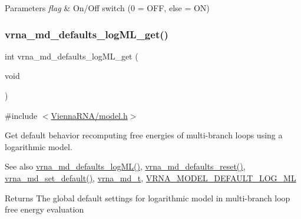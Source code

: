 \begin{DoxyParams}{Parameters}
{\em flag} & On/\+Off switch (0 = O\+FF, else = ON) \\
\hline
\end{DoxyParams}
\mbox{\label{group__model__details_ga93f04e070d529c5d0bb87c9681f6ad29}} 
\subsubsection{\texorpdfstring{vrna\+\_\+md\+\_\+defaults\+\_\+log\+M\+L\+\_\+get()}{vrna\_md\_defaults\_logML\_get()}}
{\footnotesize\ttfamily int vrna\+\_\+md\+\_\+defaults\+\_\+log\+M\+L\+\_\+get (\begin{DoxyParamCaption}\item[{void}]{ }\end{DoxyParamCaption})}



{\ttfamily \#include $<$\hyperlink{model_8h}{Vienna\+R\+N\+A/model.\+h}$>$}



Get default behavior recomputing free energies of multi-\/branch loops using a logarithmic model. 

\begin{DoxySeeAlso}{See also}
\hyperlink{group__model__details_ga3de50a73455d88c3957386933b8e1f90}{vrna\+\_\+md\+\_\+defaults\+\_\+log\+M\+L()}, \hyperlink{group__model__details_ga70834424cf804d149937de89f80ceb45}{vrna\+\_\+md\+\_\+defaults\+\_\+reset()}, \hyperlink{group__model__details_ga8ac6ff84936282436f822644bf841f66}{vrna\+\_\+md\+\_\+set\+\_\+default()}, \hyperlink{group__model__details_ga1f8a10e12a0a1915f2a4eff0b28ea17c}{vrna\+\_\+md\+\_\+t}, \hyperlink{group__model__details_ga938f68463e84fe060aa6502f428a517d}{V\+R\+N\+A\+\_\+\+M\+O\+D\+E\+L\+\_\+\+D\+E\+F\+A\+U\+L\+T\+\_\+\+L\+O\+G\+\_\+\+ML} 
\end{DoxySeeAlso}
\begin{DoxyReturn}{Returns}
The global default settings for logarithmic model in multi-\/branch loop free energy evaluation 
\end{DoxyReturn}
\mbox{\label{group__model__details_ga4e1deb3e91a8a99e5c6dd905a5eb0186}} 
